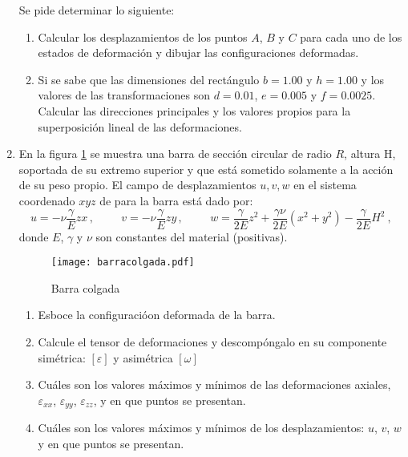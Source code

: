 \documentclass[../notas medios.tex]{subfiles}
\begin{document}
\begin{enumerate}
Se pide determinar lo siguiente:
	
\begin{enumerate}
	\item Calcular los desplazamientos de los puntos $A$, $B$ y $C$ para cada 
	uno de los estados de deformación y dibujar las configuraciones deformadas.
	\item Si se sabe que las dimensiones del rectángulo $b=1.00$ y $h=1.00$ y 
	los valores de las transformaciones son $d=0.01$, $e=0.005$ y $f=0.0025$. 
	Calcular las direcciones principales y los valores propios para la 
	superposición lineal de las deformaciones. 	
\end{enumerate}

\item  \label{punto04_d} En la figura \cref{BarraColgada} se muestra una barra 
de sección circular de radio $R$, altura H, soportada de su extremo superior y 
que está sometido solamente a la acción de su peso propio. El campo de 
desplazamientos $u,v,w$ en el sistema coordenado $xyz$ de para la barra está 
dado por:
\[u = -\nu \dfrac{\gamma}{E} z x\, ,  \hspace{1cm}	
v = -\nu \dfrac{\gamma}{E} z y\, ,  \hspace{1cm}	
w = \dfrac{\gamma}{2E} z^2 +\dfrac{\gamma \nu}{2E} (x^2+y^2)-\dfrac{\gamma}{2E} 
H^2\ ,\]
donde $E$, $\gamma$ y $\nu$ son constantes del material (positivas). 
	
\begin{figure}[H]
	\centering
	\texttt{[image: barracolgada.pdf]} \label{figure1}
	\caption{Barra colgada}
	\label{BarraColgada}
\end{figure}
%
\begin{enumerate}

\item Esboce la configuracióon deformada de la barra.	

\item Calcule el tensor de deformaciones y descompóngalo en su componente 
simétrica: $[\varepsilon]$ y asimétrica  $[\omega]$

\item Cuáles son los valores máximos y mínimos de las deformaciones axiales, 
$\varepsilon_{xx}$, $\varepsilon_{yy}$, $\varepsilon_{zz}$, y en que puntos se 
presentan.

\item Cuáles son los valores máximos y mínimos de los desplazamientos: $u$, 
$v$, $w$ y en que puntos se presentan.


\end{enumerate}
\end{enumerate}
\end{document}
